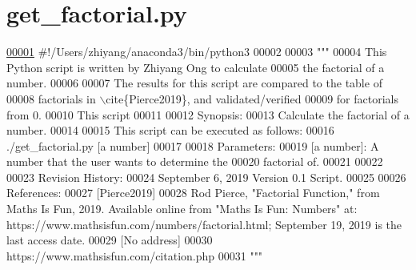 \hypertarget{get__factorial_8py_source}{}\section{get\+\_\+factorial.\+py}
\label{get__factorial_8py_source}

\begin{DoxyCode}
\hypertarget{get__factorial_8py_source_l00001}{}\hyperlink{namespaceutilities_1_1timing__measurements_1_1get__factorial}{00001} \textcolor{comment}{#!/Users/zhiyang/anaconda3/bin/python3}
00002 
00003 \textcolor{stringliteral}{"""}
00004 \textcolor{stringliteral}{    This Python script is written by Zhiyang Ong to calculate}
00005 \textcolor{stringliteral}{        the factorial of a number.}
00006 \textcolor{stringliteral}{}
00007 \textcolor{stringliteral}{    The results for this script are compared to the table of}
00008 \textcolor{stringliteral}{        factorials in \(\backslash\)cite\{Pierce2019\}, and validated/verified}
00009 \textcolor{stringliteral}{        for factorials from 0.}
00010 \textcolor{stringliteral}{    This script }
00011 \textcolor{stringliteral}{}
00012 \textcolor{stringliteral}{    Synopsis:}
00013 \textcolor{stringliteral}{    Calculate the factorial of a number.}
00014 \textcolor{stringliteral}{}
00015 \textcolor{stringliteral}{    This script can be executed as follows:}
00016 \textcolor{stringliteral}{    ./get\_factorial.py [a number]}
00017 \textcolor{stringliteral}{}
00018 \textcolor{stringliteral}{    Parameters:}
00019 \textcolor{stringliteral}{    [a number]:     A number that the user wants to determine the}
00020 \textcolor{stringliteral}{                        factorial of.}
00021 \textcolor{stringliteral}{}
00022 \textcolor{stringliteral}{}
00023 \textcolor{stringliteral}{    Revision History:}
00024 \textcolor{stringliteral}{    September 6, 2019           Version 0.1 Script.}
00025 \textcolor{stringliteral}{}
00026 \textcolor{stringliteral}{    References:}
00027 \textcolor{stringliteral}{        [Pierce2019]}
00028 \textcolor{stringliteral}{            Rod Pierce, "Factorial Function," from Maths Is Fun, 2019. Available online from "Maths Is Fun:
       Numbers" at: https://www.mathsisfun.com/numbers/factorial.html; September 19, 2019 is the last access date.}
00029 \textcolor{stringliteral}{                [No address]}
00030 \textcolor{stringliteral}{                https://www.mathsisfun.com/citation.php}
00031 \textcolor{stringliteral}{"""}

\end{DoxyCode}
